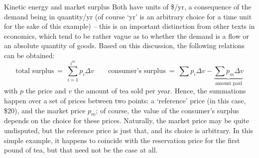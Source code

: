 \begin{econ}{Kinetic energy and market surplus}
    Both have units of \$/yr, a consequence of the demand being in quantity/yr (of course `yr' is an arbitrary choice for a time unit for the sake of this example) -- this is an important distinction from other texts in economics, which tend to be rather vague as to whether the demand is a flow or an absolute quantity of goods. Based on this discussion, the following relations can be obtained:
    \begin{equation}
        \text{total surplus}\: =\: \sum_{i = 1}^{i^m} p_i \Delta v \qquad \text{consumer's surplus} \:=\: \sum p_i \Delta v - \underbrace{\sum p_m \Delta v}_{\text{amount paid}}
    \label{eq:surplus}
    \end{equation}
    with $p$ the price and $v$ the amount of tea sold per year. Hence, the summations happen over a set of prices between two points: a `reference' price (in this case, \$20), and the market price $p_m$; of course, the value of the consumer's surplus depends on the choice for these prices. Naturally, the market price may be quite undisputed, but the reference price is just that, and its choice is arbitrary. In this simple example, it happens to coincide with the reservation price for the first pound of tea, but that need not be the case at all.


\end{econ}
